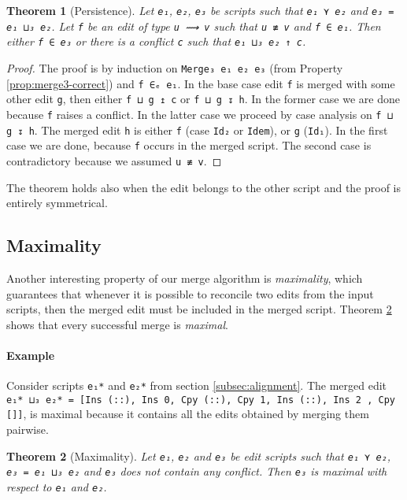 \documentclass[preprint]{sigplanconf}
\theoremstyle{plain}
\newtheorem{thm}{Theorem}
\begin{document}
				
\begin{thm}[Persistence]
Let \texttt{e₁}, \texttt{e₂}, \texttt{e₃} be scripts such that
\texttt{e₁ ⋎ e₂} and \texttt{e₃ = e₁ ⊔₃ e₂}. Let \texttt{f} be an edit
of type \texttt{u ⟿ v} such that \texttt{u ≢ v} and \texttt{f ∈ e₁}.
Then either \texttt{f ∈ e₃} or there is a conflict \texttt{c} such that
\texttt{e₁ ⊔₃ e₂ ↑ c}.
\end{thm}
\begin{proof}
  The proof is by induction on \texttt{Merge₃ e₁ e₂ e₃} (from Property
  \ref{prop:merge3-correct}) and \texttt{f ∈ₑ e₁}.
    In the base case edit \texttt{f} is merged with some other edit
    \texttt{g}, then either \texttt{f ⊔ g ↥ c} or \texttt{f ⊔ g ↧ h}.
    In the former case we are done because \texttt{f} raises a
    conflict.  In the latter case we proceed by case analysis on
    \texttt{f ⊔ g ↧ h}.
    The merged edit \texttt{h} is either \texttt{f} (case \texttt{Id₂}
    or \texttt{Idem}), or \texttt{g} (\texttt{Id₁}). In the first case
    we are done, because \texttt{f} occurs in the merged script.
    The second case is contradictory because we assumed \texttt{u ≢
      v}.
\end{proof}        

    The theorem holds also when the edit belongs to the other script and
    the proof is entirely symmetrical.
   		
    \subsection{Maximality}
    Another interesting property of our merge algorithm is
    \emph{maximality}, which guarantees that whenever it is possible
    to reconcile two edits from the input scripts, then the merged
    edit must be included in the merged script.
    Theorem \ref{thm:max} shows that every successful merge is
    \emph{maximal}.

    \paragraph{Example} 
    Consider scripts \texttt{e₁*} and \texttt{e₂*} from section
    \ref{subsec:alignment}.
    The merged edit \texttt{e₁* ⊔₃ e₂* = [Ins (::), Ins 0, Cpy (::),
      Cpy 1, Ins (::), Ins 2 , Cpy []]}, is maximal because it
    contains all the edits obtained by merging them pairwise.
    \begin{thm}[Maximality]
      \label{thm:max}
      Let \texttt{e₁}, \texttt{e₂} and \texttt{e₃} be edit scripts
      such that \texttt{e₁ ⋎ e₂}, \texttt{e₃ = e₁ ⊔₃ e₂} and
      \texttt{e₃} does not contain any conflict. Then \texttt{e₃} is
      maximal with respect to \texttt{e₁} and \texttt{e₂}.
    \end{thm}
\end{document}

